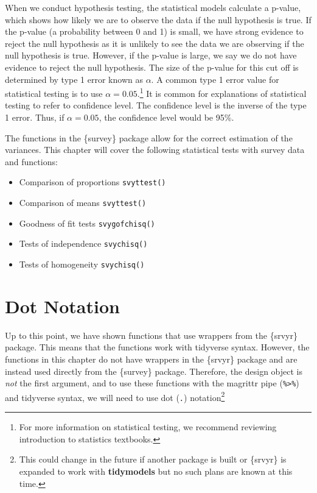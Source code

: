 \documentclass[
]{krantz}
\providecommand{\tightlist}{%
  \setlength{\itemsep}{0pt}\setlength{\parskip}{0pt}}
\begin{document}
When we conduct hypothesis testing, the statistical models calculate a p-value, which shows how likely we are to observe the data if the null hypothesis is true. If the p-value (a probability between 0 and 1) is small, we have strong evidence to reject the null hypothesis as it is unlikely to see the data we are observing if the null hypothesis is true. However, if the p-value is large, we say we do not have evidence to reject the null hypothesis. The size of the p-value for this cut off is determined by type 1 error known as \(\alpha\). A common type 1 error value for statistical testing is to use \(\alpha = 0.05\).\footnote{For more information on statistical testing, we recommend reviewing introduction to statistics textbooks.} It is common for explanations of statistical testing to refer to confidence level. The confidence level is the inverse of the type 1 error. Thus, if \(\alpha = 0.05\), the confidence level would be 95\%.

The functions in the \{survey\} package allow for the correct estimation of the variances. This chapter will cover the following statistical tests with survey data and functions:

\begin{itemize}
\tightlist
\item
  Comparison of proportions \texttt{svyttest()}
\item
  Comparison of means \texttt{svyttest()}
\item
  Goodness of fit tests \texttt{svygofchisq()}
\item
  Tests of independence \texttt{svychisq()}
\item
  Tests of homogeneity \texttt{svychisq()}
\end{itemize}

\hypertarget{dot-notation}{%
\section{Dot Notation}\label{dot-notation}}

Up to this point, we have shown functions that use wrappers from the \{srvyr\} package. This means that the functions work with tidyverse syntax. However, the functions in this chapter do not have wrappers in the \{srvyr\} package and are instead used directly from the \{survey\} package. Therefore, the design object is \emph{not} the first argument, and to use these functions with the magrittr pipe (\texttt{\%\textgreater{}\%}) and tidyverse syntax, we will need to use dot (\texttt{.}) notation\footnote{This could change in the future if another package is built or \{srvyr\} is expanded to work with \textbf{tidymodels} but no such plans are known at this time.}
\end{document}

